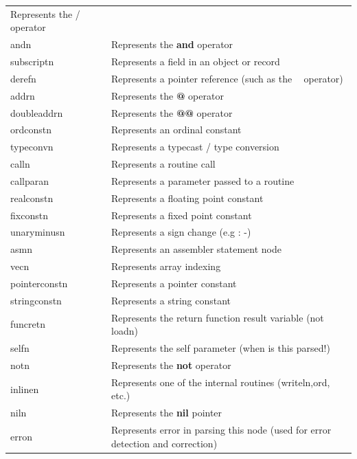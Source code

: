 \documentclass [12pt]{article}
\begin{document}
\begin{longtable}{|l|p{10cm}|}
		\textsf{Represents the / operator} \\
\textsf{andn}& 
		\textsf{Represents the }\textsf{\textbf{and}}\textsf{ operator} \\
\textsf{subscriptn}& 
		\textsf{Represents a field in an object or record} \\
\textsf{derefn}& 
		\textsf{Represents a pointer reference (such as the }\textsf{\textbf{\ }}\textsf{ operator)} \\
\textsf{addrn}& 
		\textsf{Represents the }\textsf{\textbf{@}}\textsf{ operator} \\
\textsf{doubleaddrn}& 
		\textsf{Represents the }\textsf{\textbf{@@}}\textsf{ operator} \\
\textsf{ordconstn}& 
		\textsf{Represents an ordinal constant} \\
\textsf{typeconvn}& 
		\textsf{Represents a typecast / type conversion} \\
\textsf{calln}& 
		\textsf{Represents a routine call} \\
\textsf{callparan}& 
		\textsf{Represents a parameter passed to a routine} \\
\textsf{realconstn}& 
		\textsf{Represents a floating point constant} \\
\textsf{fixconstn}& 
		\textsf{Represents a fixed point constant} \\
\textsf{unaryminusn}& 
		\textsf{Represents a sign change (e.g : -)} \\
\textsf{asmn}& 
		\textsf{Represents an assembler statement node} \\
\textsf{vecn}& 
		\textsf{Represents array indexing} \\
\textsf{pointerconstn}& 
		\textsf{Represents a pointer constant} \\
\textsf{stringconstn}& 
		\textsf{Represents a string constant} \\
\textsf{funcretn}& 
		\textsf{Represents the return function result variable (not loadn)} \\
\textsf{selfn}& 
		\textsf{Represents the self parameter (when is this parsed!)} \\
\textsf{notn}& 
		\textsf{Represents the }\textsf{\textbf{not}}\textsf{ operator} \\
\textsf{inlinen}& 
		\textsf{Represents one of the internal routines (writeln,ord, etc.)} \\
\textsf{niln}& 
		\textsf{Represents the }\textsf{\textbf{nil}}\textsf{ pointer } \\
\textsf{erron}& 
		\textsf{Represents error in parsing this node (used for error detection and correction)} \\

\end{longtable}
\end{document}
